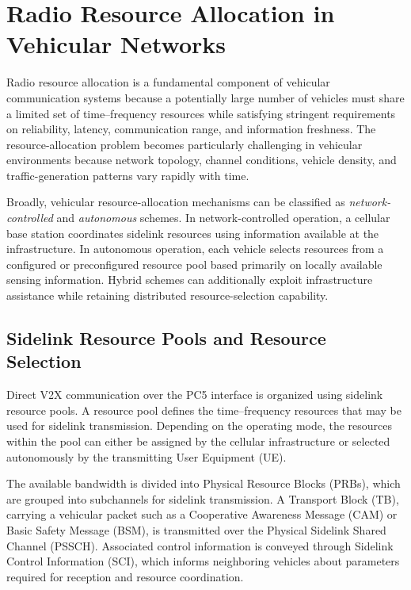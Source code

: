 \section{Radio Resource Allocation in Vehicular Networks}
\label{sec:v2x_resource_allocation}

Radio resource allocation is a fundamental component of vehicular
communication systems because a potentially large number of vehicles must
share a limited set of time--frequency resources while satisfying stringent
requirements on reliability, latency, communication range, and information
freshness. The resource-allocation problem becomes particularly challenging
in vehicular environments because network topology, channel conditions,
vehicle density, and traffic-generation patterns vary rapidly with time.

Broadly, vehicular resource-allocation mechanisms can be classified as
\emph{network-controlled} and \emph{autonomous} schemes. In
network-controlled operation, a cellular base station coordinates sidelink
resources using information available at the infrastructure. In autonomous
operation, each vehicle selects resources from a configured or preconfigured
resource pool based primarily on locally available sensing information.
Hybrid schemes can additionally exploit infrastructure assistance while
retaining distributed resource-selection capability.

\subsection{Sidelink Resource Pools and Resource Selection}

Direct V2X communication over the PC5 interface is organized using sidelink
resource pools. A resource pool defines the time--frequency resources that
may be used for sidelink transmission. Depending on the operating mode, the
resources within the pool can either be assigned by the cellular
infrastructure or selected autonomously by the transmitting User Equipment
(UE).

The available bandwidth is divided into Physical Resource Blocks (PRBs),
which are grouped into subchannels for sidelink transmission. A Transport
Block (TB), carrying a vehicular packet such as a Cooperative Awareness
Message (CAM) or Basic Safety Message (BSM), is transmitted over the
Physical Sidelink Shared Channel (PSSCH). Associated control information is
conveyed through Sidelink Control Information (SCI), which informs
neighboring vehicles about parameters required for reception and resource
coordination.

